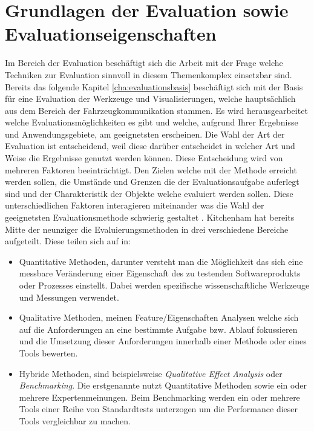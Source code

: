 \documentclass[draft=false
              ,paper=a4
              ,twoside=false
              ,fontsize=11pt
              ,headsepline
              ,BCOR10mm
              ,DIV11
              ]{scrbook}
\begin{document}
\section{Grundlagen der Evaluation sowie Evaluationseigenschaften} %
\label{sec:evaluation}

Im Bereich der Evaluation beschäftigt sich die Arbeit mit der Frage welche Techniken zur Evaluation sinnvoll in diesem Themenkomplex einsetzbar sind. Bereits das folgende Kapitel \ref{cha:evaluationsbasis} beschäftigt sich mit der Basis für eine Evaluation der Werkzeuge und Visualisierungen, welche hauptsächlich aus dem Bereich der Fahrzeugkommunikation stammen. Es wird herausgearbeitet welche Evaluationsmöglichkeiten es gibt und welche, aufgrund Ihrer Ergebnisse und Anwendungsgebiete, am geeignetsten erscheinen. Die Wahl der Art der Evaluation ist entscheidend, weil diese darüber entscheidet in welcher Art und Weise die Ergebnisse genutzt werden können. Diese Entscheidung wird von mehreren Faktoren beeinträchtigt. Den Zielen welche mit der Methode erreicht werden sollen, die Umstände und Grenzen die der Evaluationsaufgabe auferlegt sind und der Charakteristik der Objekte welche evaluiert werden sollen. Diese unterschiedlichen Faktoren interagieren miteinander was die Wahl der geeignetsten Evaluationsmethode schwierig gestaltet \cite{kitchenham_evaluating_1996-2}. Kitchenham hat bereits Mitte der neunziger die Evaluierungsmethoden in drei verschiedene Bereiche aufgeteilt. Diese teilen sich auf in: 

\begin{itemize}
  \item Quantitative Methoden, darunter versteht man die Möglichkeit das sich eine messbare Veränderung einer Eigenschaft des zu testenden Softwareprodukts oder Prozesses einstellt. Dabei werden spezifische wissenschaftliche Werkzeuge und Messungen verwendet.
  \item Qualitative Methoden, meinen Feature/Eigenschaften Analysen welche sich auf die Anforderungen an eine bestimmte Aufgabe bzw. Ablauf fokussieren und die Umsetzung dieser Anforderungen innerhalb einer Methode oder eines Tools bewerten.
  \item Hybride Methoden, sind beispielsweise \textit{Qualitative Effect Analysis} oder \textit{Benchmarking}. Die erstgenannte nutzt Quantitative Methoden sowie ein oder mehrere Expertenmeinungen. Beim Benchmarking werden ein oder mehrere Tools einer Reihe von Standardtests unterzogen um die Performance dieser Tools vergleichbar zu machen.
\end{itemize}
\end{document}
